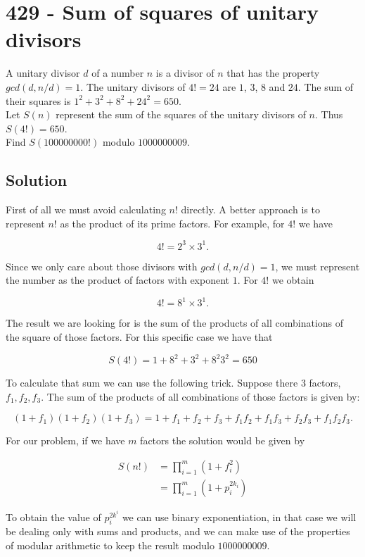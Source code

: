 \chapter*{429 - Sum of squares of unitary divisors}

 
A unitary divisor $d$ of a number $n$ is a divisor of $n$ that has the property $gcd(d, n/d) = 1$.
The unitary divisors of $4! = 24$ are $1$, $3$, $8$ and $24$.
The sum of their squares is $1^2 + 3^2 + 8^2 + 24^2 = 650.$ \\

Let $S(n)$ represent the sum of the squares of the unitary divisors of $n$. Thus $S(4!)=650$. \\

Find $S(100000000!)$ modulo $1000000009$.

\section*{Solution}

First of all we must avoid calculating $n!$ directly. A better approach is to represent $n!$ as the product of its prime factors. For example, for $4!$ we have

$$
4! = 2^3 \times 3^1.
$$

Since we only care about those divisors with $gcd(d,n/d) = 1$, we must represent the number as the product of factors with exponent $1$. For $4!$ we obtain

$$
4! = 8^1 \times 3^1.
$$

The result we are looking for is the sum of the products of all combinations of the square of those factors. For this specific case we have that

$$
S(4!) = 1 + 8^2 + 3^2 + 8^2 3^2 = 650
$$

To calculate that sum we can use the following trick. Suppose there $3$ factors, $f_1, f_2, f_3$. The sum of the products of all combinations of those factors is given by:

$$
(1 + f_1)(1 + f_2)(1 + f_3) = 1 + f_1 + f_2 + f_3 + f_1f_2 + f_1f_3 + f_2f_3 + f_1f_2f_3.
$$

For our problem, if we have $m$ factors the solution would be given by

\begin{align*}
    S(n!) &= \prod_{i=1}^m (1 + f_i^2)\\
    &= \prod_{i=1}^m (1 + p_i^{2k_i}) 
\end{align*}


To obtain the value of $p_i^{2k^i}$ we can use binary exponentiation, in that case we will be dealing only with sums and products, and we can make use of the properties of modular arithmetic to keep the result modulo  $1000000009$.